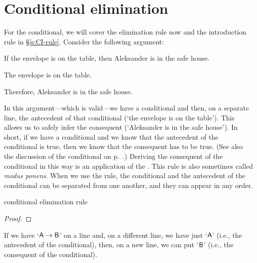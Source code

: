 

\section{Conditional elimination}

For the conditional, we will cover the elimination rule now and the introduction rule in \S \ref{s:CI-rule}. Consider the following argument:
	\begin{earg}
	\item	If the envelope is on the table, then Aleksander is in the safe house.
	\item The envelope is on the table.
	\item Therefore, Aleksander is in the safe house.
	\end{earg}
In this argument---which is valid---we have a conditional and then, on a separate line, the antecedent of that conditional (`the envelope is on the table'). This allows us to safely infer the consequent (`Aleksander is in the safe house'). In short, if we have a conditional and we know that the antecedent of the conditional is true, then we know that the consequent has to be true. (See also the discussion of the conditional on p.~\pageref{characteristic-tt-conditional}.) Deriving the consequent of the conditional in this way is an application of the .
This rule is also sometimes called \emph{modus ponens}. When we use the rule, the conditional and the antecedent of the conditional can be separated from one another, and they can appear in any order.

\medskip


\begin{factboxy}{conditional elimination rule}\label{ce-rule}
\begin{proof}
	 
\end{proof}

\small{If we have `$\mathsf{A}\rightarrow\mathsf{B}$' on a line and, on a different line, we have just `$\mathsf{A}$' (i.e., the antecedent of the conditional), then, on a new line, we can put `$\mathsf{B}$' (i.e., the consequent of the conditional).} 

\end{factboxy}


